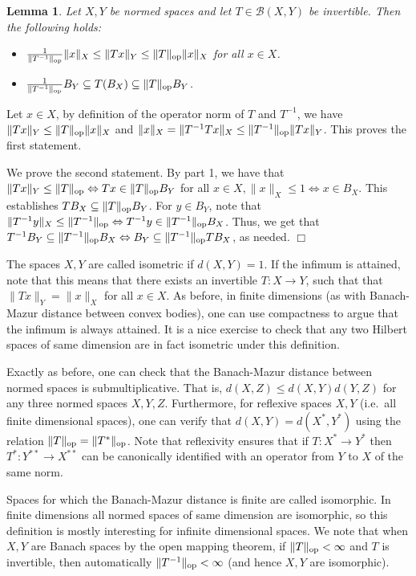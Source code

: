 \documentclass[11pt]{article}
\newtheorem{lemma}[theorem]{Lemma}
\theoremstyle{plain}
\newenvironment{proof}{\noindent {\sc Proof:}}{$\Box$ \medskip}
\theoremstyle{plain}
\begin{document}
\begin{lemma} 
Let $X,Y$ be normed spaces and let $T \in \mathcal{B}(X,Y)$ be
invertible. Then the following holds:
\begin{itemize}
\item $\frac{1}{\|T^{-1}\|_{\rm op}} \|x\|_X \leq \|Tx\|_Y \leq \|T\|_{\rm op}
\|x\|_X$ for all $x \in X$.
\item $\frac{1}{\|T^{-1}\|_{\rm op}} B_Y \subseteq T(B_X) \subseteq \|T\|_{\rm
op} B_Y$.
\end{itemize}
\end{lemma}
\begin{proof}
Let $x \in X$, by definition of the operator norm of $T$ and $T^{-1}$, we have
$\|Tx\|_Y \leq \|T\|_{\rm op}\|x\|_X$ and $\|x\|_X = \|T^{-1} T x\|_X \leq
\|T^{-1}\|_{\rm op} \|T x\|_Y$. This proves the first statement.

We prove the second statement. By part 1, we have that $\|T x\|_Y \leq
\|T\|_{\rm op} \Leftrightarrow Tx \in \|T\|_{\rm op} B_Y$ for all $x \in X,
\|x\|_X \leq 1 \Leftrightarrow x \in B_X$. This establishes $TB_X \subseteq
\|T\|_{\rm op} B_Y$. For $y \in B_Y$, note that $\|T^{-1} y\|_X \leq
\|T^{-1}\|_{\rm op} \Leftrightarrow T^{-1} y \in \|T^{-1}\|_{\rm op} B_X$. Thus,
we get that $T^{-1} B_Y \subseteq \|T^{-1}\|_{\rm op} B_X \Leftrightarrow B_Y
\subseteq \|T^{-1}\|_{\rm op} T B_X$, as needed. 
\end{proof}

The spaces $X,Y$ are called isometric if $d(X,Y) = 1$. If the infimum is
attained, note that this means that there exists an invertible $T: X
\rightarrow Y$, such that that $\|Tx\|_Y = \|x\|_X$ for all $x \in X$. As
before, in finite dimensions (as with Banach-Mazur distance between convex
bodies), one can use compactness to argue that the infimum is always attained.
It is a nice exercise to check that any two Hilbert spaces of same dimension are
in fact isometric under this definition.

Exactly as before, one can check that the Banach-Mazur distance between normed
spaces is submultiplicative. That is, $d(X,Z) \leq d(X,Y) d(Y,Z)$ for any three
normed spaces $X,Y,Z$. Furthermore, for reflexive spaces $X,Y$ (i.e.~all finite
dimensional spaces), one can verify that $d(X,Y) = d(X^*,Y^*)$ using the
relation $\|T\|_{\rm op} = \|T^*\|_{\rm op}$. Note that reflexivity ensures that
if $T: X^* \rightarrow Y^*$ then $T^*: Y^{**} \rightarrow X^{**}$ can be
canonically identified with an operator from $Y$ to $X$ of the same norm. 

Spaces for which the Banach-Mazur distance is finite are called isomorphic. In
finite dimensions all normed spaces of same dimension are isomorphic, so this
definition is mostly interesting for infinite dimensional spaces. We note that
when $X,Y$ are Banach spaces by the open mapping theorem, if $\|T\|_{\rm op} <
\infty$ and $T$ is invertible, then automatically $\|T^{-1}\|_{\rm op} < \infty$
(and hence $X,Y$ are isomorphic). 



\end{document}
